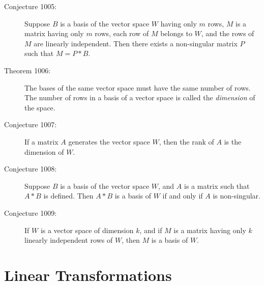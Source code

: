 \documentclass{article}
\begin{document}
\begin{description}
  \item[Conjecture 1005:] Suppose $B$ is a basis of the vector space $W$ having only $m$ rows, $M$ is a matrix having only $m$ rows, each row of $M$ belongs to $W$, and the rows of $M$ are linearly independent. Then there exists a non-singular matrix $P$ such that $M=P*B$.

  \item[Theorem 1006:] The bases of the same vector space must have the same number of rows. The number of rows in a basis of a vector space is called the \emph{dimension} of the space.

  \item[Conjecture 1007:] If a matrix $A$ generates the vector space $W$, then the rank of $A$ is the dimension of $W$.

  \item[Conjecture 1008:] Suppose $B$ is a basis of the vector space $W$, and $A$ is a matrix such that $A*B$ is defined. Then $A*B$ is a basis of $W$ if and only if $A$ is non-singular.

  \item[Conjecture 1009:] If $W$ is a vector space of dimension $k$, and if $M$ is a matrix having only $k$ linearly independent rows of $W$, then $M$ is a basis of $W$.

\end{description}


\section{Linear Transformations}
\end{document}
